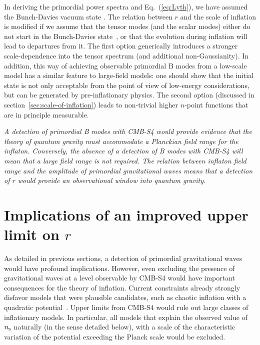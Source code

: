 In deriving the primordial power spectra and Eq.~(\ref{eq:Lyth}), we have assumed the Bunch-Davies vacuum state \cite{Bunch:1978yq}. The relation between $r$ and the scale of inflation is modified if we assume that the tensor  modes (and the scalar modes) either do not start in the Bunch-Davies state~\cite{Ashoorioon:2014nta,Collins:2014yua}, or that the evolution during inflation will lead to departures from it. The first option generically introduces a stronger scale-dependence into the tensor spectrum \cite{Aravind:2014axa,Flauger:2013hra} (and additional non-Gaussianity). In addition, this way of achieving observable primordial B modes from a low-scale model has a similar feature to large-field models: one should show that the initial state is not only acceptable from the point of view of low-energy considerations, but can be generated by pre-inflationary physics. The second option (discussed in section~\ref{sec:scale-of-inflation}) leads to non-trivial higher $n$-point functions that are in principle measurable.

{\it A detection of primordial B modes with CMB-S4 would provide evidence that the theory of quantum gravity must accommodate a Planckian field range for the inflaton. Conversely, the absence of a detection of B modes with CMB-S4 will mean that a large field range is not required. The relation between inflaton field range and the amplitude of primordial gravitational waves means that a detection of $r$ would provide an observational window into quantum gravity.}


\section{Implications of an improved upper limit on $r$} 
\label{sec:upperLimits}
As detailed in previous sections, a detection of primordial gravitational waves would have profound implications. However, even excluding the presence of gravitational waves at a level observable by CMB-S4 would have important consequences for the theory of inflation. Current constraints already strongly disfavor models that were plausible candidates, such as chaotic inflation with a quadratic potential~\cite{Ade:2015lrj,Ade:2015tva,Array:2015xqh}. Upper limits from CMB-S4 would rule out large classes of inflationary models. In particular, all models that explain the observed value of $n_{\rm s}$ naturally (in the sense detailed below), with a scale of the characteristic variation of the potential exceeding the Planck scale would be excluded.  


